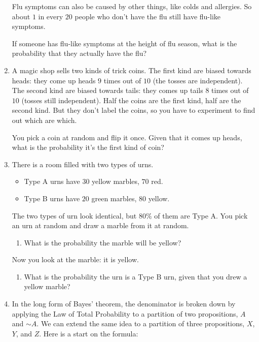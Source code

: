 \documentclass[justified]{tufte-book}
\providecommand{\tightlist}{%
  \setlength{\itemsep}{0pt}\setlength{\parskip}{0pt}}
\renewcommand{\neg}{\mathbin{\sim}}
\theoremstyle{definition}
\theoremstyle{definition}
\theoremstyle{definition}
\theoremstyle{remark}
\begin{document}
\begin{enumerate}
  Flu symptoms can also be caused by other things, like colds and allergies. So about \(1\) in every \(20\) people who don't have the flu still have flu-like symptoms.

  If someone has flu-like symptoms at the height of flu season, what is the probability that they actually have the flu?
\item
  A magic shop sells two kinds of trick coins. The first kind are biased towards heads: they come up heads \(9\) times out of \(10\) (the tosses are independent). The second kind are biased towards tails: they comes up tails \(8\) times out of \(10\) (tosses still independent). Half the coins are the first kind, half are the second kind. But they don't label the coins, so you have to experiment to find out which are which.

  You pick a coin at random and flip it once. Given that it comes up heads, what is the probability it's the first kind of coin?
\item
  There is a room filled with two types of urns.

  \begin{itemize}
  \tightlist
  \item
    Type A urns have \(30\) yellow marbles, \(70\) red.
  \item
    Type B urns have \(20\) green marbles, \(80\) yellow.
  \end{itemize}

  The two types of urn look identical, but \(80\%\) of them are Type A. You pick an urn at random and draw a marble from it at random.

  \begin{enumerate}
  \def\labelenumii{\alph{enumii}.}
  \tightlist
  \item
    What is the probability the marble will be yellow?
  \end{enumerate}

  Now you look at the marble: it is yellow.

  \begin{enumerate}
  \def\labelenumii{\alph{enumii}.}
  \setcounter{enumii}{1}
  \tightlist
  \item
    What is the probability the urn is a Type B urn, given that you drew a yellow marble?
  \end{enumerate}
\item
  In the long form of Bayes' theorem, the denominator is broken down by applying the Law of Total Probability to a partition of two propositions, \(A\) and \(\neg A\). We can extend the same idea to a partition of three propositions, \(X\), \(Y\), and \(Z\). Here is a start on the formula:


\end{enumerate}
\end{document}
